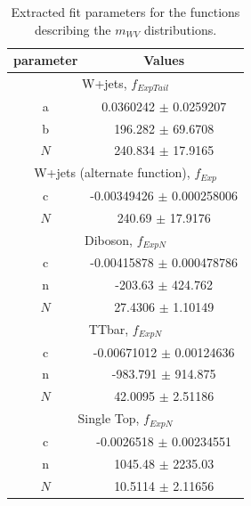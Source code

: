 \begin{table}[!htbp]
	\centering
	\begin{tabular}{||c | c||} 
	 \hline
	 parameter & Values \\
	 \hline \hline
	 \multicolumn{2}{|c|}{W+jets, $f_{ExpTail}$}\\
	 \hline
	 a 			&	0.0360242 $\pm$ 0.0259207\\
	 b 			&	196.282	$\pm$ 69.6708\\
	 $N$ 		&	240.834 $\pm$ 17.9165\\
	 \hline \hline
	 \multicolumn{2}{|c|}{W+jets (alternate function), $f_{Exp}$}\\
	 \hline
	 c 			&	-0.00349426 $\pm$ 0.000258006\\
	 $N$ 		&	240.69 $\pm$ 17.9176\\
	 \hline \hline
	 \multicolumn{2}{|c|}{Diboson, $f_{ExpN}$}\\
	 \hline
	 c 			&	-0.00415878 $\pm$ 0.000478786\\
	 n 			&	-203.63 $\pm$ 424.762\\
	 $N$ 		&	27.4306 $\pm$ 1.10149\\
	 \hline \hline
	 \multicolumn{2}{|c|}{TTbar, $f_{ExpN}$}\\
	 \hline
	 c 			&	-0.00671012 $\pm$ 0.00124636\\
	 n 			&	-983.791 $\pm$ 914.875\\
	 $N$ 		&	42.0095 $\pm$ 2.51186\\
	 \hline \hline
	 \multicolumn{2}{|c|}{Single Top, $f_{ExpN}$}\\
	 \hline
	 c 			&	-0.0026518 $\pm$ 0.00234551\\
	 n 			&	1045.48 $\pm$ 2235.03\\
	 $N$ 		&	10.5114 $\pm$ 2.11656\\
	 \hline \hline
	\end{tabular}
 	\caption{Extracted fit parameters for the functions describing the $m_{WV}$ distributions.}
 	\label{Table:BackgroundEstimation_mWWFitPars}
\end{table}


